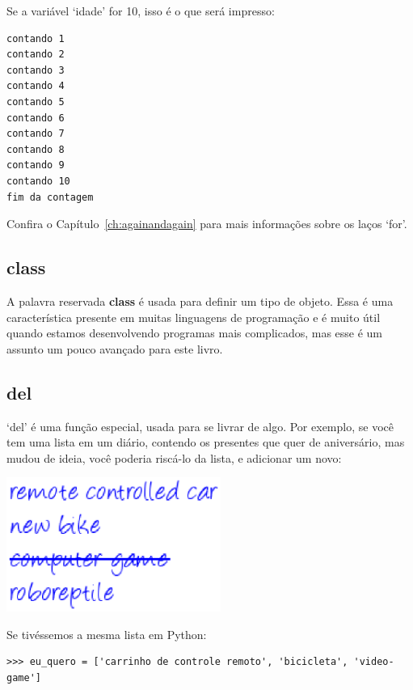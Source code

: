 \noindent
Se a variável `idade' for 10, isso é o que será impresso:

\begin{listing}
\begin{verbatim}
contando 1
contando 2
contando 3
contando 4
contando 5
contando 6
contando 7
contando 8
contando 9
contando 10
fim da contagem
\end{verbatim}
\end{listing}

\noindent
Confira o Capítulo~\ref{ch:againandagain} para mais informações sobre os laços `for'.

\subsection*{class}

A palavra reservada \textbf{class} é usada para definir um tipo de objeto. Essa é uma característica presente em muitas linguagens de programação e é muito útil quando estamos desenvolvendo programas mais complicados, mas esse é um assunto um pouco avançado para este livro.

\subsection*{del}

`del' é uma função especial, usada para se livrar de algo. Por exemplo, se você tem uma lista em um diário, contendo os presentes que quer de aniversário, mas mudou de ideia, você poderia riscá-lo da lista, e adicionar um novo:

\begin{center}
\includegraphics*[width=70mm]{eps/list.eps}
\end{center}

\noindent
Se tivéssemos a mesma lista em Python:

\begin{listing}
\begin{verbatim}
>>> eu_quero = ['carrinho de controle remoto', 'bicicleta', 'video-game']
\end{verbatim}
\end{listing}

